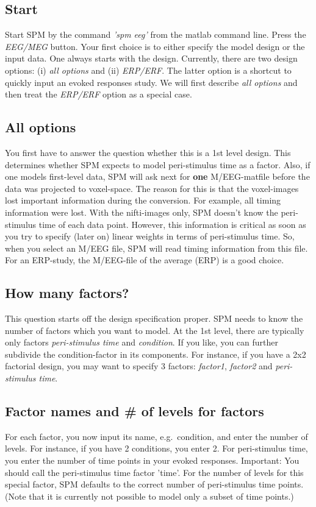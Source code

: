 \subsection{Start}
Start SPM by the command \textit{'spm eeg'} from the matlab command
line. Press the \textit{EEG/MEG} button. Your first choice is to
either specify the model design or the input data. One always starts
with the design. Currently, there are two design options: (i)
\textit{all options} and (ii) \textit{ERP/ERF}. The latter option is a
shortcut to quickly input an evoked responses study. We will first
describe \textit{all options} and then treat the \textit{ERP/ERF}
option as a special case.

\subsection{All options} 
You first have to answer the question whether
this is a 1st level design. This determines whether SPM expects to
model peri-stimulus time as a factor. Also, if one models first-level
data, SPM will ask next for \textbf{one} M/EEG-matfile before the
data was projected to voxel-space. The reason for this is that the voxel-images
lost important information during the conversion. For example, all timing
information were lost. With the nifti-images only, SPM doesn't
know the peri-stimulus time of each data point. However, this
information is critical as soon as you try to specify (later on)
linear weights in terms of peri-stimulus time. So, when you select an
M/EEG file, SPM will read timing information from this file. For an
ERP-study, the M/EEG-file of the average (ERP) is a good choice.

\subsection{How many factors?}
This question starts off the design specification proper. SPM needs to
know the number of factors which you want to model. At the 1st level,
there are typically only factors \textit{peri-stimulus time} and
\textit{condition}. If you like, you can further subdivide the
condition-factor in its components. For instance, if you have a 2x2
factorial design, you may want to specify 3 factors: \textit{factor1},
\textit{factor2} and  \textit{peri-stimulus time}. 

\subsection{Factor names and \# of levels for factors}
For each factor, you now input its name, e.g.~condition, and enter the
number of levels. For instance, if you have 2 conditions, you enter
2. For peri-stimulus time, you enter the number of time points in your
evoked responses. Important: You should call the peri-stimulus time
factor  'time'. For the number of levels for this special factor, SPM
defaults to the correct number of peri-stimulus time points. (Note
that it is currently not possible to model only a subset of time points.)

